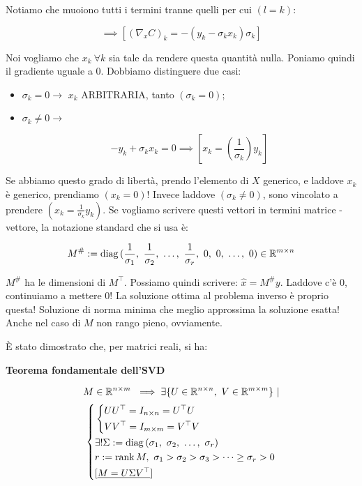 Notiamo che muoiono tutti i termini tranne quelli per cui $(l=k)$:

\[
	\implies [(\nabla_x{C})_k = -(y_k-\sigma_kx_k)\sigma_k]
\]

Noi vogliamo che $x_k\ \forall k$ sia tale da rendere questa quantità nulla. Poniamo quindi il gradiente uguale a 0. Dobbiamo distinguere due casi:

\begin{itemize}

\item{$\sigma_k=0 \rightarrow$} $x_k$ ARBITRARIA, tanto $(\sigma_k=0)$;
\item{$\sigma_k\neq 0 \rightarrow$}

\[
	-y_k+\sigma_kx_k = 0 \implies [x_k=(\frac{1}{\sigma_k})y_k]
\]

\end{itemize}

Se abbiamo questo grado di libertà, prendo l'elemento di $X$ generico, e laddove $x_k$ è generico, prendiamo $(x_k=0)$! Invece laddove $(\sigma_k\neq 0)$, sono vincolato a prendere $(x_k=\frac{1}{\sigma_k}y_k)$. Se vogliamo scrivere questi vettori in termini matrice - vettore, la notazione standard che si usa è:

\[
	M^\# := \diag{(\frac{1}{\sigma_1},\ \frac{1}{\sigma_2},\ \dots,\ \frac{1}{\sigma_r},\ 0,\ 0,\ \dots,\ 0)}\in\R^{m\times n}
\]

$M^\#$ ha le dimensioni di $M^\top$. Possiamo quindi scrivere: $\hat{x}=M^\# y$. Laddove c'è 0, continuiamo a mettere 0! La soluzione ottima al problema inverso è proprio questa! Soluzione di norma minima che meglio approssima la soluzione esatta! Anche nel caso di $M$ non rango pieno, ovviamente.

\`E stato dimostrato che, per matrici reali, si ha:

\begin{thrm}{\textbf{Teorema fondamentale dell'SVD}}

\[
	M\in\mathbb{R}^{n\times m}\ \implies \exists\{U\in\mathbb{R}^{n\times n},\ V\in\mathbb{R}^{m\times m}\}\ |
\]
\[
	\left\{
	\begin{aligned}
	&\left\{
	\begin{aligned}
	&UU^\top = I_{n\times n} = U^\top U\\
	&VV^\top = I_{m\times m} = V^\top V
	\end{aligned}
	\right.\\
	&\exists! \Sigma := \diag{(\sigma_1,\ \sigma_2,\ \dots,\ \sigma_r)}\\
	&r := \rank{M},\ \sigma_1>\sigma_2>\sigma_3>\dots\geq \sigma_r>0\\
	&[\underline{M=U\Sigma V^\top}]
	\end{aligned}
	\right.
\]

\end{thrm}

